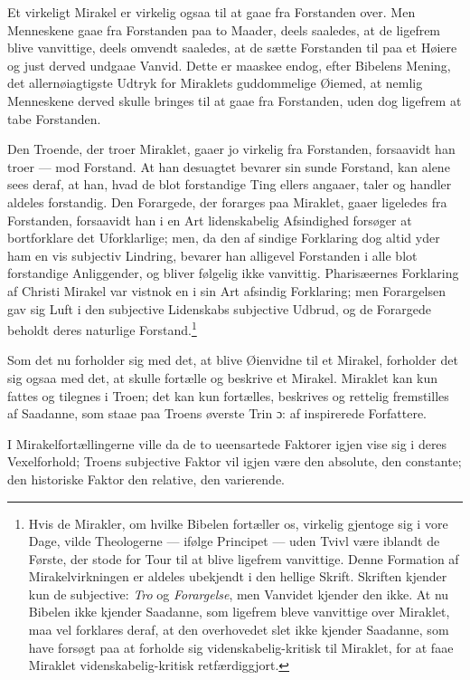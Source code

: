 \documentclass[12pt,a4paper]{book}
\newcommand{\opage}[1]{\marginnote{\footnotesize\textit{[#1]}}}
\begin{document}
Et virkeligt Mirakel er virkelig ogsaa til at gaae fra Forstanden over. Men
Menneskene gaae fra Forstanden paa to Maader, deels saaledes, at de ligefrem
blive vanvittige, deels omvendt saaledes, at de sætte Forstanden til paa et
Høiere og just derved undgaae Vanvid. Dette er maaskee endog, efter Bibelens
Mening, det allernøiagtigste Udtryk for Miraklets guddommelige Øiemed, at
nemlig Menneskene derved skulle bringes til at gaae fra Forstanden, uden dog
ligefrem at tabe Forstanden.

Den Troende, der troer Miraklet, gaaer jo virkelig fra Forstanden, forsaavidt
han troer --- mod Forstand. At han desuagtet bevarer sin sunde Forstand, kan
alene sees deraf, at han, hvad de blot forstandige Ting ellers angaaer, taler
og handler aldeles forstandig. Den Forargede, der forarges paa Miraklet, gaaer
ligeledes fra Forstanden, forsaavidt han i en Art lidenskabelig Afsindighed
forsøger at bortforklare det Uforklarlige; men, da den af\-%
\opage{50}sindige Forklaring dog altid yder ham en vis subjectiv Lindring, bevarer han
alligevel Forstanden i alle blot forstandige Anliggender, og bliver følgelig
ikke vanvittig. Pharisæernes Forklaring af Christi Mirakel var vistnok en i sin
Art afsindig Forklaring; men Forargelsen gav sig Luft i den subjective
Lidenskabs subjective Udbrud, og de Forargede beholdt deres naturlige
Forstand.\footnote{Hvis de Mirakler, om hvilke Bibelen fortæller os, virkelig
gjentoge sig i vore Dage, vilde Theologerne --- ifølge Principet --- uden Tvivl
være iblandt de Første, der stode for Tour til at blive ligefrem vanvittige.
Denne Formation af Mirakelvirkningen er aldeles ubekjendt i den hellige Skrift.
Skriften kjender kun de subjective: \emph{Tro} og \emph{Forargelse}, men Vanvidet
kjender den ikke. At nu Bibelen ikke kjender Saadanne, som ligefrem bleve
vanvittige over Miraklet, maa vel forklares deraf, at den overhovedet slet ikke
kjender Saadanne, som have forsøgt paa at forholde sig
videnskabelig-kritisk til Miraklet, for at faae Miraklet videnskabelig-kritisk
retfærdiggjort.}

Som det nu forholder sig med det, at blive Øienvidne til et Mirakel, forholder
det sig ogsaa med det, at skulle fortælle og beskrive et Mirakel. Miraklet kan
kun fattes og tilegnes i Troen; det kan kun fortælles, beskrives og rettelig
fremstilles af Saadanne, som staae paa Troens øverste Trin ɔ: af inspirerede
Forfattere.

I Mirakelfortællingerne ville da de to ueensartede Faktorer igjen vise sig i
deres Vexelforhold; Troens subjective Faktor vil igjen være den absolute, den
constante; den historiske Faktor den relative, den varierende.
\end{document}
